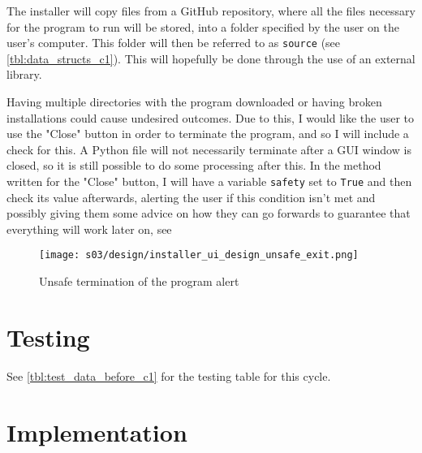         The installer will copy files from a GitHub repository, where all the files necessary for the program to run will be stored, into a folder specified by the user on the user's computer. This folder will then be referred to as \verb|source| (see \autoref{tbl:data_structs_c1}). This will hopefully be done through the use of an external library.

        Having multiple directories with the program downloaded or having broken installations could cause undesired outcomes. Due to this, I would like the user to use the "Close" button in order to terminate the program, and so I will include a check for this. A Python file will not necessarily terminate after a GUI window is closed, so it is still possible to do some processing after this. In the method written for the "Close" button, I will have a variable \verb|safety| set to \verb|True| and then check its value afterwards, alerting the user if this condition isn't met and possibly giving them some advice on how they can go forwards to guarantee that everything will work later on, see 

        \begin{figure}[!ht]
            \centering
            \texttt{[image: s03/design/installer\_ui\_design\_unsafe\_exit.png]}
            \caption{Unsafe termination of the program alert}
            \label{fig:installer_ui_design_unsafe_exit_c1}
        \end{figure}


\section{Testing}

    See \autoref{tbl:test_data_before_c1} for the testing table for this cycle.


\section{Implementation}



